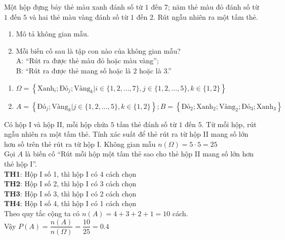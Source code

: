 \begin{bt}%
  Một hộp đựng bảy thẻ màu xanh đánh số từ $ \text{1}$ đến $ \text{7}$; năm thẻ màu đỏ đánh số từ $ \text{1}$ đến $ \text{5}$ và hai thẻ màu vàng đánh số từ $ \text{1}$ đến 2. Rút ngẫu nhiên ra một tấm thẻ. 
  \begin{enumerate}
  	\item Mô tả không gian mẫu.
  	\item  Mỗi biến cố sau là tập con nào của không gian mẫu?\\
  	A: ``Rút ra được thẻ màu đỏ hoặc màu  vàng''; \\
  	B: ``Rút ra được thẻ mang số hoặc là $ \text{2}$ hoặc là 3.''    
  \end{enumerate}
 
	\loigiai
	{
\begin{enumerate}
	\item  $\Omega = \left\{ \text{Xanh}_i;\text{Đỏ}_j;\text{Vàng}_k \Big\vert i\in \{1,2,\ldots,7\}, j\in\{1,2,\ldots,5\}, k \in \{1,2\} \right\}$
	\item $A=\left\{\text{Đỏ}_j;\text{Vàng}_k \Big\vert  j\in\{1,2,\ldots,5\}, k \in \{1,2\}\right\} ; B=\left\{\text{Đỏ}_2;\text{Xanh}_2;\text{Vàng}_2;\text{Đỏ}_3;\text{Xanh}_3\right\}$
\end{enumerate}
	}
\end{bt}

\begin{bt}%
Có hộp I và hộp II, mỗi hộp chứa $ \text{5}$ tấm thẻ đánh số từ $ \text{1}$ đến $ \text{5}$. Từ mỗi hộp, rút ngẫu nhiên ra một tấm thẻ. Tính xác suất để thẻ rút ra từ hộp II mang số lớn hơn số trên thẻ rút ra từ hộp $\mathrm{I}$.
	\loigiai
	{Không gian mẫu $n(\Omega)=5\cdot 5=25$
		\\
		Gọi $A$ là biến cố ``Rút mỗi hộp một tấm thẻ sao cho thẻ hộp II mang số lớn hơn thẻ hộp I''.
		\\
	\textbf{TH1}: Hộp I số 1, thì hộp I có 4 cách chọn\\
	\textbf{TH2}: Hộp I số 2, thì hộp I có 3 cách chọn\\
	\textbf{TH3}: Hộp I số 3, thì hộp I có 2 cách chọn\\
	\textbf{TH4}: Hộp I số 4, thì hộp I có 1 cách chọn\\
	Theo quy tắc cộng ta có $n(A)=4 + 3 + 2+ 1=10$ cách.\\
	Vậy $P(A)=\dfrac{n(A)}{n(\Omega)}=\dfrac{10}{25}=0.4$
	}
\end{bt}

